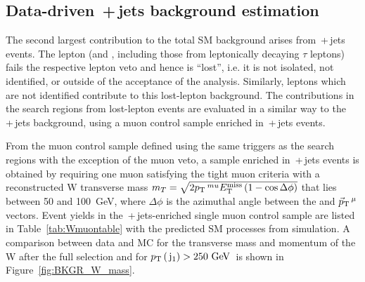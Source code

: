 \subsection{Data-driven \wlnubr\,+\,jets background estimation}
\label{sec:wjets}

The second largest contribution to the total SM background arises from \wlnubr\,+\,jets events. 
The lepton (\e and \mu, including those from leptonically decaying $\tau$ leptons) fails the respective lepton veto
and hence is ``lost'', i.e. it is not isolated, not identified, or outside of the acceptance of 
the analysis. 
Similarly, \tauh leptons which are not identified contribute to this lost-lepton background.
The contributions in the search regions from lost-lepton events are evaluated in a similar way to the \znunubr\,+\,jets background, using a muon control sample enriched in \wmunubr\,+\,jets events.

From the muon control sample defined using the same triggers as the search regions with the exception of the muon veto, a sample enriched in \wmunubr\,+\,jets events is obtained by requiring one muon satisfying the tight muon criteria with a reconstructed W transverse mass $m_{T} = \sqrt{2 p_{\text{T}}\,^{mu} E_{\text{T}}^{\text{miss}}\, (1 - \cos{\Delta \phi}) }$ that lies between 50 and 100~GeV, where $\Delta\phi$ is the azimuthal angle between the \metvmu and $\vec{p}_{\text{T}}\,^{\mu}$ vectors.
Event yields in the \wmunubr\,+\,jets-enriched single muon control sample are listed in Table~\ref{tab:Wmuontable} with the predicted SM processes from simulation. 
A comparison between data and MC for the transverse mass and momentum of the W after the full selection and for $p_{\text{T}}\,(\,\mathrm{j}_1) > 250~\mathrm{GeV}\,$ is shown in Figure~\ref{fig:BKGR_W_mass}.


